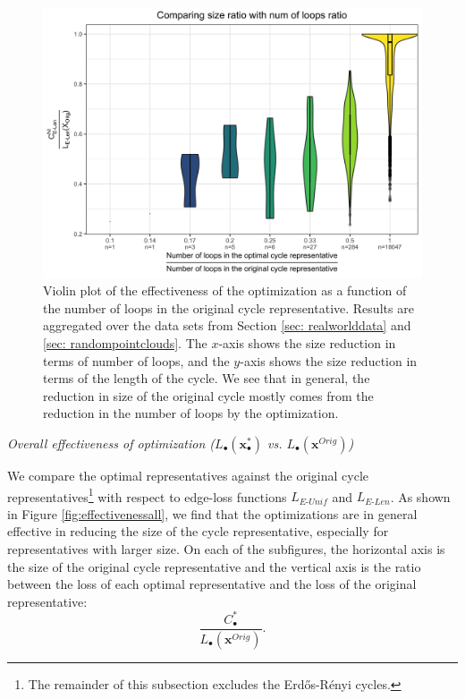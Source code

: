 \documentclass[11pt,onecolumn]{article}
\newcommand{\originalrep}{\mathbf{x}^{Orig}}
\newcommand{\optimalrep}{\mathbf{x}}
\newcommand{\se}{Section }
\newcommand{\fig}{Figure }
\newcommand{\EU}{_{E\text{-}Unif}}
\newcommand{\EL}{_{E\text{-}Len}}
\theoremstyle{plain}
\theoremstyle{definition}
\begin{document}
\begin{figure}[]
    \centering
    \includegraphics[width=.7\textwidth]{figures/sizeratio_loopratio.jpg}
    \caption{Violin plot of the effectiveness of the optimization as a function of the number of loops in the original cycle representative.  Results are aggregated over the data sets from \se \ref{sec: realworlddata} and \ref{sec: randompointclouds}. The $x$-axis shows the size reduction in terms of number of loops, and the $y$-axis shows the size reduction in terms of the length of the cycle. We see that in general, the reduction in size of the original cycle mostly comes from the reduction in the number of loops by the optimization. } 
    \label{fig:reductioncompare}
\end{figure}
 
\vspace{.1in}
\noindent \emph{Overall effectiveness of optimization ($L_\bullet(\optimalrep_\bullet^*)$ vs. $L_\bullet(\originalrep)$)} 

We compare the optimal representatives against the original cycle representatives\footnote{The remainder of this subsection excludes the Erd\H{o}s-R\'enyi cycles.} with respect to edge-loss functions $L\EU$ and $L\EL$. As shown in \fig \ref{fig:effectivenessall}, we find that the optimizations are in general effective in reducing the size of the cycle representative, especially for representatives with larger size. On each of the subfigures, the horizontal axis is the size of the original cycle representative and the vertical axis is the ratio between the loss of each optimal representative and the loss of the original representative:
$$\frac{C^*_\bullet}{L_\bullet(\originalrep)}.$$ 
 
\end{document}
